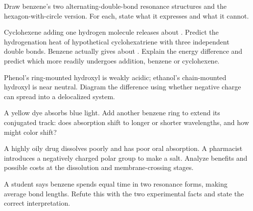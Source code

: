 \begin{sikaoti}
\item Draw benzene's two alternating-double-bond resonance structures and the hexagon-with-circle version. For each, state what it expresses and what it cannot.
\item Cyclohexene adding one hydrogen molecule releases about . Predict the hydrogenation heat of hypothetical cyclohexatriene with three independent double bonds. Benzene actually gives about . Explain the energy difference and predict which more readily undergoes addition, benzene or cyclohexene.
\item Phenol's ring-mounted hydroxyl is weakly acidic; ethanol's chain-mounted hydroxyl is near neutral. Diagram the difference using whether negative charge can spread into a delocalized system.
\item A yellow dye absorbs blue light. Add another benzene ring to extend its conjugated track: does absorption shift to longer or shorter wavelengths, and how might color shift?
\item A highly oily drug dissolves poorly and has poor oral absorption. A pharmacist introduces a negatively charged polar group to make a salt. Analyze benefits and possible costs at the dissolution and membrane-crossing stages.
\item A student says benzene spends equal time in two resonance forms, making average bond lengths. Refute this with the two experimental facts and state the correct interpretation.
\end{sikaoti}

